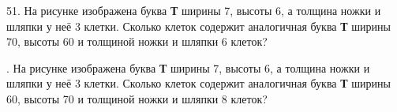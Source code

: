 51. На рисунке изображена буква {\bf Т} ширины 7, высоты 6, а толщина ножки и шляпки у неё 3 клетки. Сколько клеток содержит аналогичная буква {\bf Т} ширины 70, высоты 60 и толщиной ножки и шляпки 6 клеток?
\begin{center}
\begin{figure}[ht!]
\end{figure}
\end{center}
\newpage
{}. На рисунке изображена буква {\bf Т} ширины 7, высоты 6, а толщина ножки и шляпки у неё 3 клетки. Сколько клеток содержит аналогичная буква {\bf Т} ширины 60, высоты 70 и толщиной ножки и шляпки 8 клеток?
\begin{center}
\begin{figure}[ht!]
\end{figure}
\end{center}
